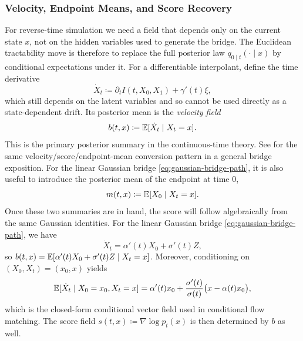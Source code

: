 \subsubsection{Velocity, Endpoint Means, and Score Recovery}

For reverse-time simulation we need a field that depends only on the current state \(x\), not on the hidden variables used to generate the bridge.
The Euclidean tractability move is therefore to replace the full posterior law \(q_{0\mid t}(\cdot\mid x)\) by conditional expectations under it.
For a differentiable interpolant, define the time derivative
\[
  \dot X_t \coloneqq \partial_t I(t,X_0,X_1) + \gamma'(t)\xi,
\]
which still depends on the latent variables and so cannot be used directly as a state-dependent drift.
Its posterior mean is the \emph{velocity field}
\begin{equation}
  b(t,x) \coloneqq \mathbb{E}[\dot X_t \mid X_t=x].
  \label{eq:si-velocity-def}
\end{equation}
This is the primary posterior summary in the continuous-time theory.
See \citet[\S4.1, eqs.~(38)--(40)]{holderrieth_erives_2026_intro_flow_matching} for the same velocity/score/endpoint-mean conversion pattern in a general bridge exposition.
For the linear Gaussian bridge \eqref{eq:gaussian-bridge-path}, it is also useful to introduce the posterior mean of the endpoint at time \(0\),
\begin{equation}
  m(t,x) \coloneqq \mathbb{E}[X_0\mid X_t=x].
  \label{eq:si-endpoint-mean-x0-def}
\end{equation}
Once these two summaries are in hand, the score will follow algebraically from the same Gaussian identities.
For the linear Gaussian bridge \eqref{eq:gaussian-bridge-path}, we have
\[
  \dot X_t = \alpha'(t)X_0 + \sigma'(t)Z,
\]
so \(b(t,x)=\mathbb{E}[\alpha'(t)X_0+\sigma'(t)Z\mid X_t=x]\).
Moreover, conditioning on \((X_0,X_t)=(x_0,x)\) yields
\[
  \mathbb{E}[\dot X_t\mid X_0=x_0,X_t=x]
  =
  \alpha'(t)x_0
  +
  \frac{\sigma'(t)}{\sigma(t)}\bigl(x-\alpha(t)x_0\bigr),
\]
which is the closed-form conditional vector field used in conditional flow matching.
The score field \(s(t,x)\coloneqq \nabla\log p_t(x)\) is then determined by \(b\) as well.

